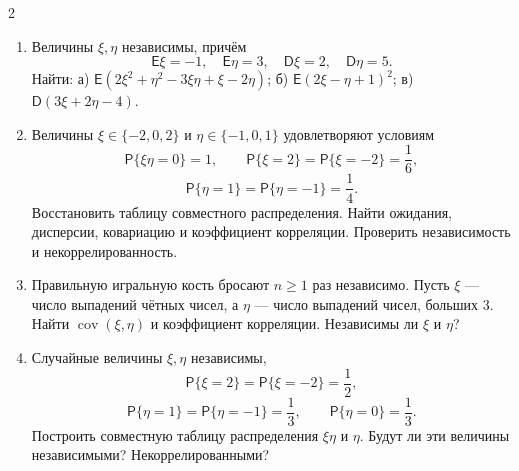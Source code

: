 \documentclass[a4paper,10pt]{article}
\newcommand{\PP}{\mathsf P}
\newcommand{\EE}{\mathsf E}
\newcommand{\DD}{\mathsf D}
\begin{document}
\begin{multicols}{2}
\begin{enumerate}
\item\begin{minipage}[t]{\linewidth} Величины $\xi,\eta$ независимы, причём
\[
\EE\xi=-1,\quad\EE\eta=3,\quad\DD\xi=2,\quad\DD\eta=5.
\]
Найти: а) $\EE(2\xi^2+\eta^2-3\xi\eta+\xi-2\eta)$;
б) $\EE(2\xi-\eta+1)^2$; в) $\DD(3\xi+2\eta-4)$.
\end{minipage}


\item\begin{minipage}[t]{\linewidth} Величины $\xi\in\{-2,0,2\}$ и $\eta\in\{-1,0,1\}$ удовлетворяют условиям
\[
\PP\{\xi\eta=0\}=1,\qquad\PP\{\xi=2\}=\PP\{\xi=-2\}=\frac16,
\]
\[
\PP\{\eta=1\}=\PP\{\eta=-1\}=\frac14.
\]
Восстановить таблицу совместного распределения. Найти ожидания, дисперсии, ковариацию и коэффициент корреляции. Проверить независимость и некоррелированность.
\end{minipage}


\item\begin{minipage}[t]{\linewidth} Правильную игральную кость бросают $n\geq1$ раз независимо. Пусть $\xi$ --- число выпадений чётных чисел, а $\eta$ --- число выпадений чисел, больших 3. Найти $\operatorname{cov}(\xi,\eta)$ и коэффициент корреляции. Независимы ли $\xi$ и $\eta$?
\end{minipage}


\item\begin{minipage}[t]{\linewidth} Случайные величины $\xi,\eta$ независимы,
\[
\PP\{\xi=2\}=\PP\{\xi=-2\}=\frac12,
\]
\[
\PP\{\eta=1\}=\PP\{\eta=-1\}=\frac13,\qquad\PP\{\eta=0\}=\frac13.
\]
Построить совместную таблицу распределения $\xi\eta$ и $\eta$. Будут ли эти величины независимыми? Некоррелированными?
\end{minipage}
\end{enumerate}
\end{multicols}
\end{document}
